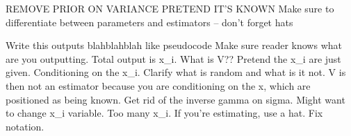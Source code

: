


\usepackage[english]{babel}
\usepackage[margin = 1in]{geometry}


\usepackage{mathrsfs}
\usepackage{amsfonts}
\usepackage{amsmath}
\usepackage{amsthm}
\usepackage{amssymb}
\usepackage{physics}
\usepackage{dsfont}
\usepackage{esint}


\usepackage{enumerate}
\usepackage[shortlabels]{enumitem}
\usepackage{framed}
\usepackage{csquotes}


\usepackage{float}
\usepackage{tabularx}
\usepackage{xcolor}
\usepackage{multicol}
\usepackage{subcaption}
\usepackage{caption}
\captionsetup{format = hang, margin = 10pt, font = small, labelfont = bf}

\usepackage[round, authoryear]{natbib}

\usepackage{hyperref}



   REMOVE PRIOR ON VARIANCE PRETEND IT'S KNOWN
   Make sure to differentiate between parameters and estimators -- don't forget hats

    Write this outputs blahblahblah like pseudocode
    Make sure reader knows what are you outputting. Total output is x_i. 
    What is V?? Pretend the x_i are just given. Conditioning on the x_i. 
    Clarify what is random and what is it not. 
    V is then not an estimator because you are conditioning on the x, which are positioned as being known. 
    Get rid of the inverse gamma on sigma. 
    Might want to change x_i variable. Too many x_i. 
    If you're estimating, use a hat. Fix notation. 